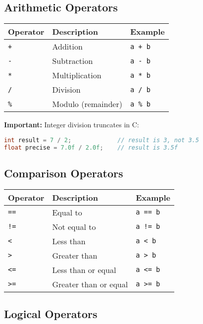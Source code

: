 \documentclass[11pt, a4paper]{article}
\newcommand{\code}[1]{\texttt{#1}}
\begin{document}
\subsection*{Arithmetic Operators}

\begin{center}
\begin{tabular}{lll}
\toprule
Operator & Description & Example \\
\midrule
\code{+} & Addition & \code{a + b} \\
\code{-} & Subtraction & \code{a - b} \\
\code{*} & Multiplication & \code{a * b} \\
\code{/} & Division & \code{a / b} \\
\code{\%} & Modulo (remainder) & \code{a \% b} \\
\bottomrule
\end{tabular}
\end{center}

\textbf{Important:} Integer division truncates in C:
\begin{lstlisting}[language=C]
int result = 7 / 2;             // result is 3, not 3.5
float precise = 7.0f / 2.0f;    // result is 3.5f
\end{lstlisting}

\subsection*{Comparison Operators}

\begin{center}
\begin{tabular}{lll}
\toprule
Operator & Description & Example \\
\midrule
\code{==} & Equal to & \code{a == b} \\
\code{!=} & Not equal to & \code{a != b} \\
\code{<} & Less than & \code{a < b} \\
\code{>} & Greater than & \code{a > b} \\
\code{<=} & Less than or equal & \code{a <= b} \\
\code{>=} & Greater than or equal & \code{a >= b} \\
\bottomrule
\end{tabular}
\end{center}

\subsection*{Logical Operators}
\end{document}
